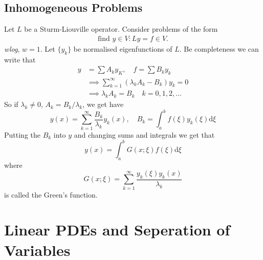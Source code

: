 \documentclass{article}
\begin{document}
\subsection{Inhomogeneous Problems}
Let $ L $ be a Sturm-Liouville operator. Consider problems of the form
\begin{align*}
	\text{find } y\in V : Ly=f\in V.
\end{align*}
\textit{wlog}, $ w=1 $. Let $ \{y_k\} $ be normalised eigenfunctions of $ L $. Be completeness we can write that
\begin{align*}
	y&=\sum A_ky_K,\quad f=\sum B_ky_k\\
	 &\implies \sum_{k=1}^\infty (\lambda_kA_k-B_k)y_k=0\\
	 &\implies \lambda_kA_k=B_k\quad k=0,1,2,\dots
\end{align*}
So if $ \lambda_k\ne 0 $, $ A_k=B_k/\lambda_k $, we get have
\[
	y(x)=\sum_{k=1}^\infty\frac{B_k}{\lambda_k}y_k(x),\quad B_k=\int_a^bf(\xi)y_k(\xi)\mathrm d\xi
\]
Putting the $ B_k $ into $ y $ and changing sums and integrals we get that
\[
	y(x)=\int_a^bG(x;\xi)f(\xi)\mathrm d\xi
\]
where
\[
	G(x;\xi)=\sum_{k=1}^\infty\frac{y_k(\xi)y_k(x)}{\lambda_k}
\]
is called the Green's function.
\section{Linear PDEs and Seperation of Variables}
\end{document}
